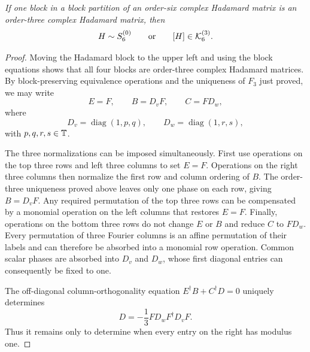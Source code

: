 {\emph{If one block in a block partition of an order-six complex Hadamard matrix is an order-three complex Hadamard matrix, then}}
\begin{equation}
{H\sim S_6^{(0)}
\qquad\text{or}\qquad
[H]\in\mathcal K_6^{(3)}.}
\label{eq:fourierblockalternative}
\end{equation}

\begin{proof}
Moving the Hadamard block to the upper left and using the block equations shows that all four blocks are order-three complex Hadamard matrices.  By block-preserving equivalence operations and the uniqueness of $F_3$ just proved, we may write
\begin{equation}
E=F,\qquad B=D_vF,\qquad C=FD_w,
\label{eq:fouriernormalform}
\end{equation}
where
\begin{equation}
D_v=\operatorname{diag}(1,p,q),\qquad
D_w=\operatorname{diag}(1,r,s),
\label{eq:DvDw}
\end{equation}
with $p,q,r,s\in\mathbb T$.

The three normalizations can be imposed simultaneously.  First use operations on the top three rows and left three columns to set $E=F$. Operations on the right three columns then normalize the first row and column ordering of $B$. The order-three uniqueness proved above leaves only one phase on each row, giving $B=D_vF$. Any required permutation of the top three rows can be compensated by a monomial operation on the left columns that restores $E=F$.  Finally, operations on the bottom three rows do not change $E$ or $B$ and reduce $C$ to $FD_w$.  Every permutation of three Fourier columns is an affine permutation of their labels and can therefore be absorbed into a monomial row operation.  Common scalar phases are absorbed into $D_v$ and $D_w$, whose first diagonal entries can consequently be fixed to one.

The off-diagonal column-orthogonality equation $E^{\dagger}B+C^{\dagger}D=0$ uniquely determines
\begin{equation}
D=-\frac{1}{3}FD_wF^{\dagger}D_vF.
\label{eq:Dfourierformula}
\end{equation}
Thus it remains only to determine when every entry on the right has modulus one.


\end{proof}
